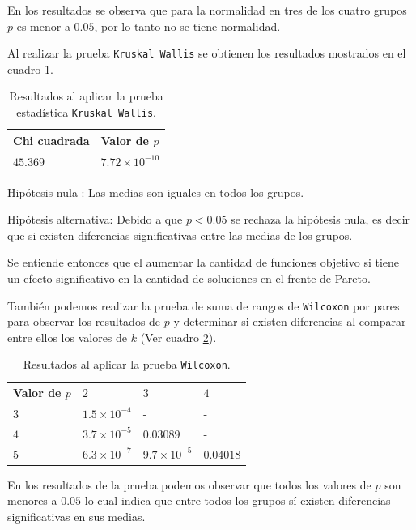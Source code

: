\documentclass{article}
\begin{document}
En los resultados se observa que para la normalidad en tres de los cuatro grupos $p$ es menor a $0.05$, por lo tanto no se tiene normalidad.
\bigskip

Al realizar la prueba \texttt{Kruskal Wallis} se obtienen los resultados mostrados en el cuadro \ref{Cuadro2}.

\begin{table}[h!]
\centering
\caption{Resultados al aplicar la prueba estadística \texttt{Kruskal Wallis}.}
\smallskip

\begin{tabular}{ |p{2.1cm}|p{2.1cm}|}
 \hline
 Chi cuadrada & Valor de $p$ \\
 \hline
 $45.369$ & $7.72\times 10^{-10}$ \\
 \hline
\end{tabular}
\label{Cuadro2}
\end{table}

Hipótesis nula : Las medias son iguales en todos los grupos.
\smallskip

Hipótesis alternativa: Debido a que $p < 0.05$ se rechaza la hipótesis nula, es decir que si existen diferencias significativas entre las medias de los grupos. 
\bigskip

Se entiende entonces que el aumentar la cantidad de funciones objetivo si tiene un efecto significativo en la cantidad de soluciones en el frente de Pareto.
\bigskip

También podemos realizar la prueba de suma de rangos de \texttt{Wilcoxon} por pares para observar los resultados de $p$ y determinar si existen diferencias al comparar entre ellos los valores de $k$ (Ver cuadro \ref{Cuadro3}).

\begin{table}[ht]
\centering
\caption{Resultados al aplicar la prueba \texttt{Wilcoxon}.}
\smallskip

\begin{tabular}{|p{1.7cm}|p{1.7cm}|p{1.7cm}|p{1.7cm}|}
 \hline
Valor de $p$ & $2$ & $3$ & $4$ \\
 \hline
 $3$ & $1.5\times 10^{-4}$ & - & - \\
 \hline
 $4$ & $3.7\times 10^{-5}$ & $0.03089$ & -\\
 \hline
 $5$ & $6.3\times 10^{-7}$ & $9.7\times 10^{-5}$ & $0.04018$ \\
 \hline
\end{tabular}
\label{Cuadro3}
\end{table}

En los resultados de la prueba podemos observar que todos los valores de $p$ son menores a $0.05$ lo cual indica que entre todos los grupos sí existen diferencias significativas en sus medias.
\bigskip
\end{document}
